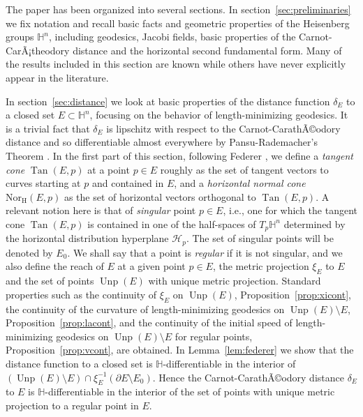 \documentclass[10pt]{amsart}
\theoremstyle{definition}
\theoremstyle{remark}
\numberwithin{equation}{section}
\begin{document}
The paper has been organized into several sections. In section~\ref{sec:preliminaries} we fix notation and recall basic facts and geometric properties of the Heisenberg groups ${{\mathbb{H}}}^n$, including geodesics, Jacobi fields, basic properties of the Carnot-CarÃ¡theodory distance and the horizontal second fundamental form. Many of the results included in this section are known while others have never explicitly appear in the literature. 

In section~\ref{sec:distance} we look at basic properties of the distance function $\delta_E$ to a closed set $E\subset{{\mathbb{H}}}^n$, focusing on the behavior of length-minimizing geodesics. It is a trivial fact that $\delta_E$ is lipschitz with respect to the Carnot-CarathÃ©odory distance and so differentiable almost everywhere by Pansu-Rademacher's Theorem \cite{MR979599}. In the first part of this section, following Federer \cite{MR0110078}, we define a \emph{tangent cone} $\operatorname{Tan}(E,p)$ at a point $p\in E$ roughly as the set of tangent vectors to curves starting at $p$ and contained in $E$, and a \emph{horizontal normal cone} $\operatorname{Nor_{H}}(E,p)$ as the set of horizontal vectors orthogonal to $\operatorname{Tan}(E,p)$. A relevant notion here is that of \emph{singular} point $p\in E$, i.e., one for which the tangent cone $\operatorname{Tan}(E,p)$ is contained in one of the half-spaces of $T_p{{\mathbb{H}}}^n$ determined by the horizontal distribution hyperplane ${\mathcal{H}}_p$. The set of singular points will be denoted by $E_0$. We shall say that a point is \emph{regular} if it is not singular, and we also define the reach of $E$ at a given point $p\in E$, the metric projection $\xi_E$ to $E$ and the set of points $\operatorname{Unp}(E)$ with unique metric projection. Standard properties such as the continuity of $\xi_E$ on $\operatorname{Unp}(E)$, Proposition~\ref{prop:xicont}, the continuity of the curvature of length-minimizing geodesics on $\operatorname{Unp}(E)\setminus E$, Proposition~\ref{prop:lacont}, and the continuity of the initial speed of length-minimizing geodesics on $\operatorname{Unp}(E)\setminus E$ for regular points, Proposition~\ref{prop:vcont}, are obtained. In Lemma~\ref{lem:federer} we show that the distance function to a closed set is ${{\mathbb{H}}}$-differentiable in the interior of $(\operatorname{Unp}(E)\setminus E)\cap\xi_E^{-1}({\partial} E\setminus E_0)$. Hence the Carnot-CarathÃ©odory distance $\delta_E$ to $E$ is ${{\mathbb{H}}}$-differentiable in the interior of the set of points with unique metric projection to a regular point in $E$.
\end{document}
